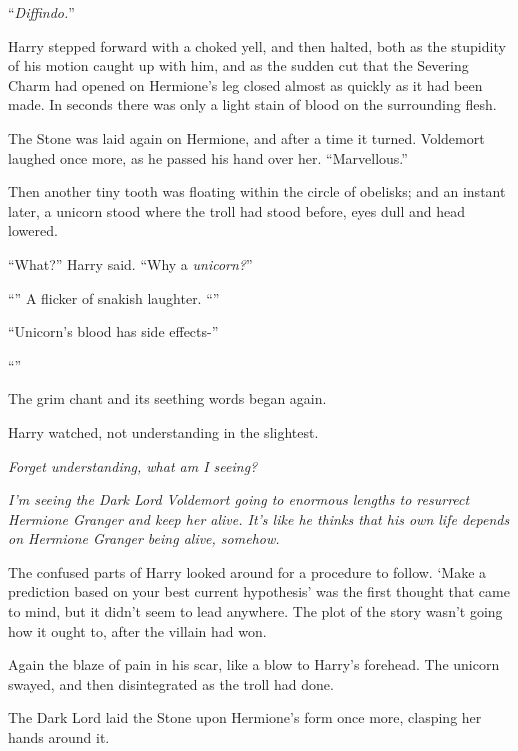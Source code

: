 “\emph{Diffindo.}”

Harry stepped forward with a choked yell, and then halted, both as the stupidity of his motion caught up with him, and as the sudden cut that the Severing Charm had opened on Hermione’s leg closed almost as quickly as it had been made. In seconds there was only a light stain of blood on the surrounding flesh.

The Stone was laid again on Hermione, and after a time it turned. Voldemort laughed once more, as he passed his hand over her. “Marvellous.”

Then another tiny tooth was floating within the circle of obelisks; and an instant later, a unicorn stood where the troll had stood before, eyes dull and head lowered.

“What?” Harry said. “Why a \emph{unicorn?}”

“” A flicker of snakish laughter. “”

“Unicorn’s blood has side effects-”

“”

The grim chant and its seething words began again.

Harry watched, not understanding in the slightest.

\emph{Forget understanding, what am I seeing?}

\emph{I’m seeing the Dark Lord Voldemort going to enormous lengths to resurrect Hermione Granger and keep her alive. It’s like he thinks that his own life depends on Hermione Granger being alive, somehow.}

The confused parts of Harry looked around for a procedure to follow. ‘Make a prediction based on your best current hypothesis’ was the first thought that came to mind, but it didn’t seem to lead anywhere. The plot of the story wasn’t going how it ought to, after the villain had won.

Again the blaze of pain in his scar, like a blow to Harry’s forehead. The unicorn swayed, and then disintegrated as the troll had done.

The Dark Lord laid the Stone upon Hermione’s form once more, clasping her hands around it.

